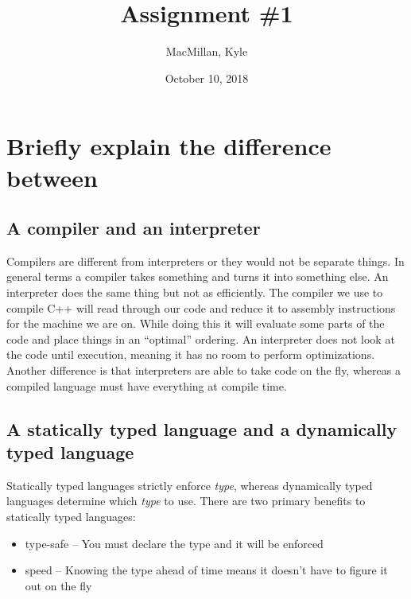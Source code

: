 \documentclass{article}
\title{\textbf{Assignment \#1}}
\author{MacMillan, Kyle}
\date{October 10, 2018}
\begin{document}
\maketitle
{}

\newpage
{}   %
\tableofcontents
{}



\newpage
{}  %
\hypersetup{
    citecolor=blue,
    filecolor=black,
    linkcolor=blue,
    urlcolor=blue
}

\setcounter{page}{1}
\section[Problem 1]{Briefly explain the difference between}
\subsection[Compilers and Interpreters]{A compiler and an interpreter}
Compilers are different from interpreters or they would not be separate things. In general terms a compiler takes something and turns it into something else. An interpreter does the same thing but not as efficiently. The compiler we use to compile C++ will read through our code and reduce it to assembly instructions for the machine we are on. While doing this it will evaluate some parts of the code and place things in an ``optimal'' ordering. An interpreter does not look at the code until execution, meaning it has no room to perform optimizations. Another difference is that interpreters are able to take code on the fly, whereas a compiled language must have everything at compile time. 

\subsection[Statically and Dynamically Typed Languages]{A statically typed language and a dynamically typed language}
Statically typed languages strictly enforce \textit{type}, whereas dynamically typed languages determine which \textit{type} to use. There are two primary benefits to statically typed languages:\\
\begin{itemize}
    \item type-safe -- You must declare the type and it will be enforced
    \item speed -- Knowing the type ahead of time means it doesn't have to figure it out on the fly
\end{itemize}
\end{document}

